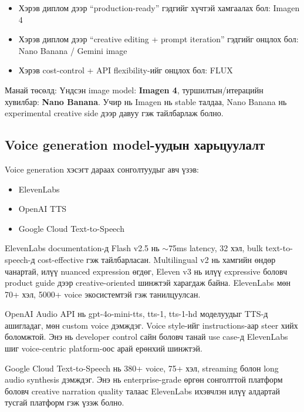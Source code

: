 \begin{itemize}
\item Хэрэв диплом дээр ``production-ready'' гэдгийг хүчтэй хамгаалах бол: Imagen 4
\item Хэрэв диплом дээр ``creative editing + prompt iteration'' гэдгийг онцлох бол: Nano Banana / Gemini image
\item Хэрэв cost-control + API flexibility-ийг онцлох бол: FLUX
\end{itemize}

Манай төсөлд: Үндсэн image model: \textbf{Imagen 4}, туршилтын/итерацийн хувилбар: \textbf{Nano Banana}. Учир нь Imagen нь stable талдаа, Nano Banana нь experimental creative side дээр давуу гэж тайлбарлаж болно.

\subsection{Voice generation model-уудын харьцуулалт}

Voice generation хэсэгт дараах сонголтуудыг авч үзэв:

\begin{itemize}
\item ElevenLabs
\item OpenAI TTS
\item Google Cloud Text-to-Speech
\end{itemize}

ElevenLabs documentation-д Flash v2.5 нь $\sim$75ms latency, 32 хэл, bulk text-to-speech-д cost-effective гэж тайлбарласан. Multilingual v2 нь хамгийн өндөр чанартай, илүү nuanced expression өгдөг, Eleven v3 нь илүү expressive боловч product guide дээр creative-oriented шинжтэй харагдаж байна. ElevenLabs мөн 70+ хэл, 5000+ voice экосистемтэй гэж танилцуулсан.

OpenAI Audio API нь gpt-4o-mini-tts, tts-1, tts-1-hd моделуудыг TTS-д ашигладаг, мөн custom voice дэмждэг. Voice style-ийг instructions-аар steer хийх боломжтой. Энэ нь developer control сайн боловч танай use case-д ElevenLabs шиг voice-centric platform-оос арай ерөнхий шинжтэй.

Google Cloud Text-to-Speech нь 380+ voice, 75+ хэл, streaming болон long audio synthesis дэмждэг. Энэ нь enterprise-grade өргөн сонголттой платформ боловч creative narration quality талаас ElevenLabs ихэвчлэн илүү алдартай тусгай платформ гэж үзэж болно.

